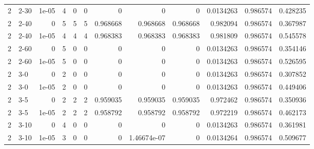 \begin{tabular}{rlrrrrrrrrrr}
     2 & 2-30   &      1e-05 &           4 &                 0 &                 0 &     0           &     0           &      0           &        0.0134263 &               0.986574 &           0.428235 \\
     2 & 2-40   &      0     &           5 &                 5 &                 5 &     0.968668    &     0.968668    &      0.968668    &        0.982094  &               0.986574 &           0.367987 \\
     2 & 2-40   &      1e-05 &           4 &                 4 &                 4 &     0.968383    &     0.968383    &      0.968383    &        0.981809  &               0.986574 &           0.545578 \\
     2 & 2-60   &      0     &           5 &                 0 &                 0 &     0           &     0           &      0           &        0.0134263 &               0.986574 &           0.354146 \\
     2 & 2-60   &      1e-05 &           5 &                 0 &                 0 &     0           &     0           &      0           &        0.0134263 &               0.986574 &           0.526595 \\
     2 & 3-0    &      0     &           2 &                 0 &                 0 &     0           &     0           &      0           &        0.0134263 &               0.986574 &           0.307852 \\
     2 & 3-0    &      1e-05 &           2 &                 0 &                 0 &     0           &     0           &      0           &        0.0134263 &               0.986574 &           0.449406 \\
     2 & 3-5    &      0     &           2 &                 2 &                 2 &     0.959035    &     0.959035    &      0.959035    &        0.972462  &               0.986574 &           0.350936 \\
     2 & 3-5    &      1e-05 &           2 &                 2 &                 2 &     0.958792    &     0.958792    &      0.958792    &        0.972219  &               0.986574 &           0.462173 \\
     2 & 3-10   &      0     &           4 &                 0 &                 0 &     0           &     0           &      0           &        0.0134263 &               0.986574 &           0.361981 \\
     2 & 3-10   &      1e-05 &           3 &                 0 &                 0 &     0           &     1.46674e-07 &      0           &        0.0134264 &               0.986574 &           0.509677 \\

\end{tabular}
